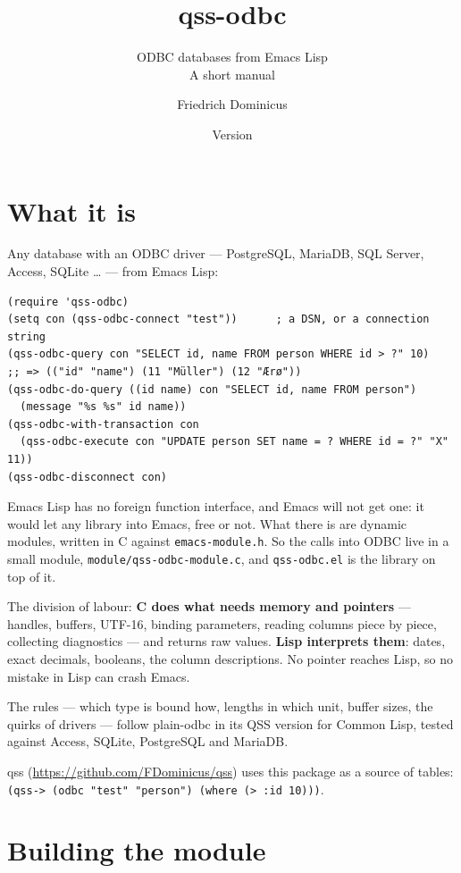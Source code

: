 \documentclass[
  paper=a4, fontsize=11pt, parskip=half, headings=small,
  toc=bibliography, numbers=noenddot, DIV=12
]{scrreprt}
\title{qss-odbc}
\subtitle{ODBC databases from Emacs Lisp\\[1ex]
  \normalsize A short manual}
\author{Friedrich Dominicus}
\date{Version \qssversion}
\newcommand{\code}[1]{\texttt{#1}}
\newcommand{\file}[1]{\texttt{#1}}
\newcommand{\qss}{\textsf{qss}}
\begin{document}
\maketitle
\tableofcontents

\chapter{What it is}

Any database with an ODBC driver --- PostgreSQL, MariaDB, SQL Server, Access,
SQLite \ldots{} --- from Emacs Lisp:

\begin{lstlisting}
(require 'qss-odbc)
(setq con (qss-odbc-connect "test"))      ; a DSN, or a connection string
(qss-odbc-query con "SELECT id, name FROM person WHERE id > ?" 10)
;; => (("id" "name") (11 "Müller") (12 "Ærø"))
(qss-odbc-do-query ((id name) con "SELECT id, name FROM person")
  (message "%s %s" id name))
(qss-odbc-with-transaction con
  (qss-odbc-execute con "UPDATE person SET name = ? WHERE id = ?" "X" 11))
(qss-odbc-disconnect con)
\end{lstlisting}

Emacs Lisp has no foreign function interface, and Emacs will not get one: it
would let any library into Emacs, free or not. What there is are dynamic
modules, written in C against \file{emacs-module.h}. So the calls into ODBC
live in a small module, \file{module/qss-odbc-module.c}, and
\file{qss-odbc.el} is the library on top of it.

The division of labour: \textbf{C does what needs memory and pointers} ---
handles, buffers, UTF-16, binding parameters, reading columns piece by piece,
collecting diagnostics --- and returns raw values. \textbf{Lisp interprets
them}: dates, exact decimals, booleans, the column descriptions. No pointer
reaches Lisp, so no mistake in Lisp can crash Emacs.

The rules --- which type is bound how, lengths in which unit, buffer sizes,
the quirks of drivers --- follow plain-odbc in its QSS version for Common
Lisp, tested against Access, SQLite, PostgreSQL and MariaDB.

\qss{} (\url{https://github.com/FDominicus/qss}) uses this package as a
source of tables: \code{(qss-> (odbc "test" "person") (where (> :id 10)))}.

\chapter{Building the module}
\end{document}
